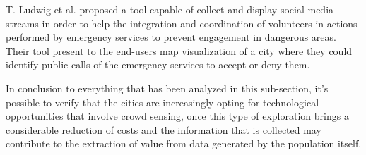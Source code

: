 T. Ludwig et al. \cite{kn:Ludwig2015} proposed a tool capable of collect and display social media streams in order to help the integration and coordination of volunteers in actions performed by emergency services to prevent engagement in dangerous areas. Their tool present to the end-users map visualization of a city where they could identify public calls of the emergency services to accept or deny them.

In conclusion to everything that has been analyzed in this sub-section, it's possible to verify that the cities are increasingly opting for technological opportunities that involve crowd sensing, once this type of exploration brings a considerable reduction of costs and the information that is collected may contribute to the extraction of value from data generated by the population itself.

